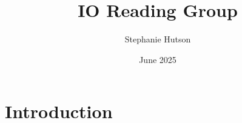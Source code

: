 \documentclass{article}
\title{IO Reading Group}
\author{Stephanie Hutson}
\date{June 2025}
\begin{document}
\maketitle

\section{Introduction}
\end{document}
